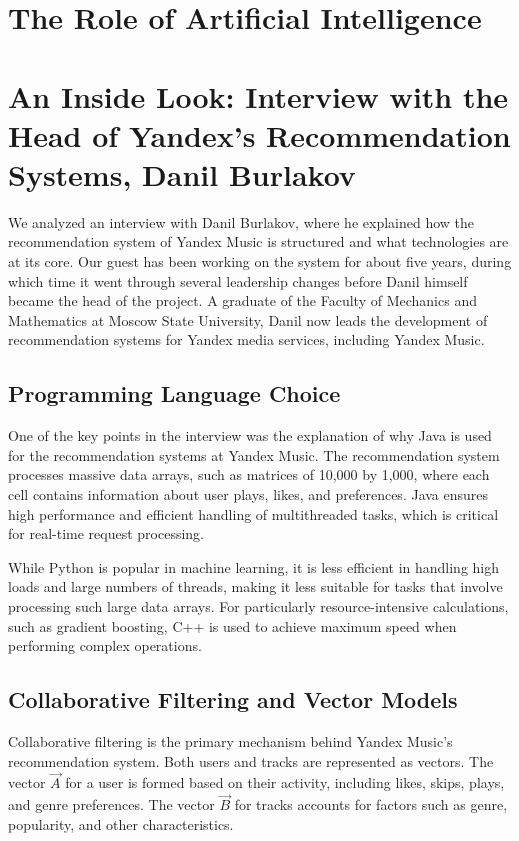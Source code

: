 \documentclass[12pt,a4paper]{article}
\begin{document}
\section{The Role of Artificial Intelligence}

\section{An Inside Look: Interview with the Head of Yandex's Recommendation Systems, Danil Burlakov}

    We analyzed an interview with Danil Burlakov, where he explained how the recommendation system of Yandex Music is structured and what technologies are at its core. Our guest has been working on the system for about five years, during which time it went through several leadership changes before Danil himself became the head of the project. A graduate of the Faculty of Mechanics and Mathematics at Moscow State University, Danil now leads the development of recommendation systems for Yandex media services, including Yandex Music.

\subsection{Programming Language Choice}

One of the key points in the interview was the explanation of why Java is used for the recommendation systems at Yandex Music. The recommendation system processes massive data arrays, such as matrices of 10,000 by 1,000, where each cell contains information about user plays, likes, and preferences. Java ensures high performance and efficient handling of multithreaded tasks, which is critical for real-time request processing.

While Python is popular in machine learning, it is less efficient in handling high loads and large numbers of threads, making it less suitable for tasks that involve processing such large data arrays. For particularly resource-intensive calculations, such as gradient boosting, C++ is used to achieve maximum speed when performing complex operations.

\subsection{Collaborative Filtering and Vector Models}

Collaborative filtering is the primary mechanism behind Yandex Music’s recommendation system. Both users and tracks are represented as vectors. The vector $\vec{A}$ for a user is formed based on their activity, including likes, skips, plays, and genre preferences. The vector $\vec{B}$ for tracks accounts for factors such as genre, popularity, and other characteristics.
\end{document}
